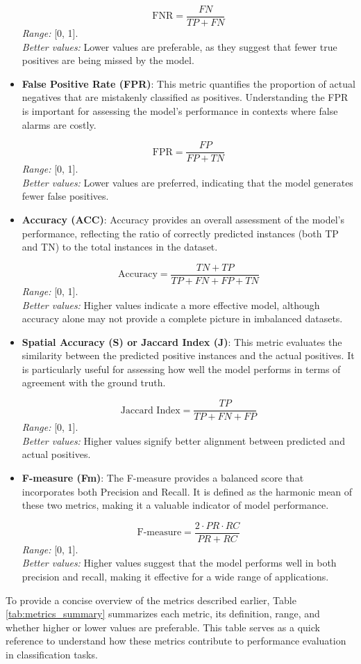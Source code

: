 \documentclass{article}
\begin{document}
\begin{itemize}
	\[
	\text{FNR} = \frac{FN}{TP + FN}
	\]
	\textit{Range:} [0, 1]. \\
	\textit{Better values:} Lower values are preferable, as they suggest that fewer true positives are being missed by the model.
	
	\item \textbf{False Positive Rate (FPR)}: This metric quantifies the proportion of actual negatives that are mistakenly classified as positives. Understanding the FPR is important for assessing the model's performance in contexts where false alarms are costly.
	
	\[
	\text{FPR} = \frac{FP}{FP + TN}
	\]
	\textit{Range:} [0, 1]. \\
	\textit{Better values:} Lower values are preferred, indicating that the model generates fewer false positives.
	
	\item \textbf{Accuracy (ACC)}: Accuracy provides an overall assessment of the model's performance, reflecting the ratio of correctly predicted instances (both TP and TN) to the total instances in the dataset.
	
	\[
	\text{Accuracy} = \frac{TN + TP}{TP + FN + FP + TN}
	\]
	\textit{Range:} [0, 1]. \\
	\textit{Better values:} Higher values indicate a more effective model, although accuracy alone may not provide a complete picture in imbalanced datasets.
	
	\item \textbf{Spatial Accuracy (S) or Jaccard Index (J)}: This metric evaluates the similarity between the predicted positive instances and the actual positives. It is particularly useful for assessing how well the model performs in terms of agreement with the ground truth.
	
	\[
	\text{Jaccard Index} = \frac{TP}{TP + FN + FP}
	\]
	\textit{Range:} [0, 1]. \\
	\textit{Better values:} Higher values signify better alignment between predicted and actual positives.
	
	\item \textbf{F-measure (Fm)}: The F-measure provides a balanced score that incorporates both Precision and Recall. It is defined as the harmonic mean of these two metrics, making it a valuable indicator of model performance.
	
	\[
	\text{F-measure} = \frac{2 \cdot PR \cdot RC}{PR + RC}
	\]
	\textit{Range:} [0, 1]. \\
	\textit{Better values:} Higher values suggest that the model performs well in both precision and recall, making it effective for a wide range of applications.
\end{itemize}
To provide a concise overview of the metrics described earlier, Table \ref{tab:metrics_summary} summarizes each metric, its definition, range, and whether higher or lower values are preferable. This table serves as a quick reference to understand how these metrics contribute to performance evaluation in classification tasks.
\end{document}
